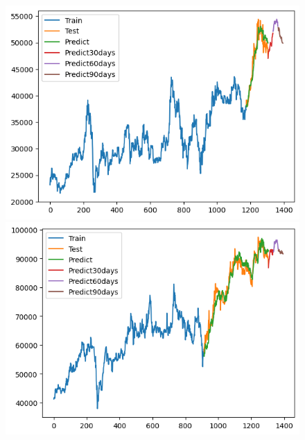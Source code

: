 \begin{figure}[H]
\begin{minipage}{0.15\textwidth}
    \centering
    \includegraphics[width=1\textwidth]{resources/chapter-5/newdata1/result/BIDV_NBeats_9-1.png}
    \end{minipage}
    \hfill
    \begin{minipage}{0.15\textwidth}
    \centering
    \includegraphics[width=1\textwidth]{resources/chapter-5/newdata1/result/VCB_NBeats_7-3.png}
    \end{minipage}
    \hfill
    \begin{minipage}{0.15\textwidth}
    \centering

\end{minipage}
\end{figure}
